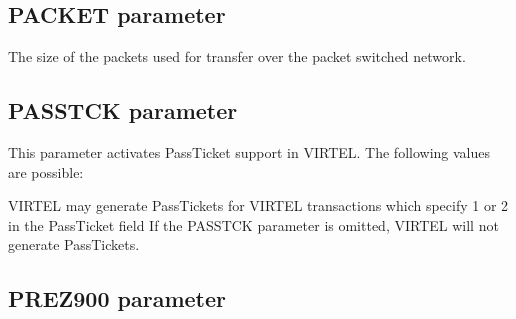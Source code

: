 \documentclass[letterpaper,10pt,english]{sphinxmanual}
\begin{document}
\ignorespaces 

\subsection{PACKET parameter}
\label{\detokenize{Installation_Guide:packet-parameter}}\label{\detokenize{Installation_Guide:index-100}}
\begin{sphinxVerbatim}[commandchars=\\\{\}]
 
\end{sphinxVerbatim}

\sphinxAtStartPar
{} \sphinxhyphen{} The size of the packets used for transfer over the packet switched network.

\label{\detokenize{Installation_Guide:virtvrrig-passtck}}
\ignorespaces 

\subsection{PASSTCK parameter}
\label{\detokenize{Installation_Guide:passtck-parameter}}\label{\detokenize{Installation_Guide:index-101}}
\begin{sphinxVerbatim}[commandchars=\\\{\}]
 
\end{sphinxVerbatim}

\sphinxAtStartPar
This parameter activates PassTicket support in VIRTEL. The following values are possible:

\sphinxAtStartPar
{} \sphinxhyphen{} VIRTEL may generate PassTickets for VIRTEL transactions which specify 1 or 2 in the PassTicket field If the PASSTCK parameter is omitted, VIRTEL will not generate PassTickets.

\ignorespaces 

\subsection{PREZ900 parameter}
\label{\detokenize{Installation_Guide:prez900-parameter}}\label{\detokenize{Installation_Guide:index-102}}
\begin{sphinxVerbatim}[commandchars=\\\{\}]
 
\end{sphinxVerbatim}
\end{document}

